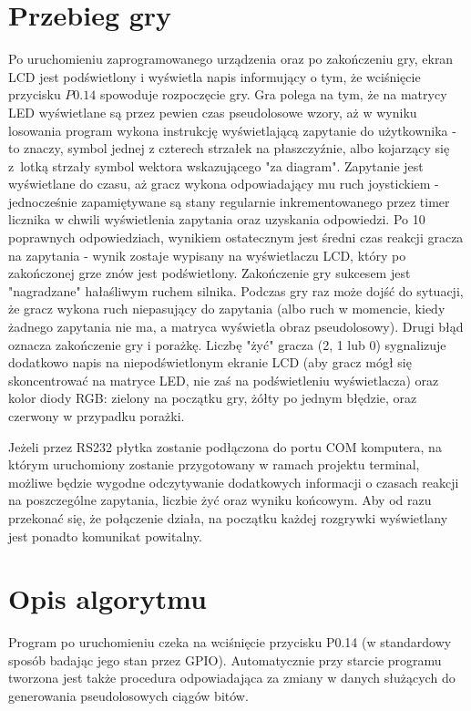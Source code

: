 \documentclass[a4paper, portrait,11pt]{article}
\begin{document}
\section{Przebieg gry}
Po uruchomieniu zaprogramowanego urządzenia oraz po zakończeniu gry, ekran
LCD jest podświetlony i wyświetla napis informujący o tym, że wciśnięcie
przycisku $P0.14$ spowoduje rozpoczęcie gry. Gra polega na tym, że
na matrycy LED wyświetlane są przez pewien czas pseudolosowe wzory,
aż w wyniku losowania program wykona instrukcję wyświetlającą
zapytanie do użytkownika - to znaczy, symbol jednej z czterech strzałek
na płaszczyźnie, albo kojarzący się z~lotką strzały symbol wektora
wskazującego "za diagram". Zapytanie jest wyświetlane do czasu, aż
gracz wykona odpowiadający mu ruch joystickiem - jednocześnie
zapamiętywane są stany regularnie inkrementowanego przez timer
licznika w chwili wyświetlenia zapytania oraz uzyskania odpowiedzi.
Po 10 poprawnych odpowiedziach, wynikiem ostatecznym jest średni
czas reakcji gracza na zapytania - wynik zostaje wypisany na wyświetlaczu LCD,
który po zakończonej grze znów jest podświetlony. Zakończenie gry sukcesem
jest "nagradzane" hałaśliwym ruchem silnika. Podczas gry raz może dojść
do sytuacji, że gracz wykona ruch niepasujący do zapytania (albo
ruch w momencie, kiedy żadnego zapytania nie ma, a matryca wyświetla
obraz pseudolosowy). Drugi błąd oznacza zakończenie gry i porażkę.
Liczbę "żyć" gracza (2, 1 lub 0) sygnalizuje dodatkowo napis
na niepodświetlonym ekranie LCD (aby gracz mógł się skoncentrować
na matryce LED, nie zaś na podświetleniu wyświetlacza) oraz kolor
diody RGB: zielony na początku gry, żółty po jednym błędzie,
oraz czerwony w przypadku porażki.

Jeżeli przez RS232 płytka zostanie podłączona do portu COM komputera,
na którym uruchomiony zostanie przygotowany w ramach projektu
terminal, możliwe będzie wygodne odczytywanie dodatkowych
informacji o czasach reakcji na poszczególne zapytania,
liczbie żyć oraz wyniku końcowym. Aby od razu przekonać się,
że połączenie działa, na początku każdej rozgrywki wyświetlany
jest ponadto komunikat powitalny.

\section{Opis algorytmu}
Program po uruchomieniu czeka na wciśnięcie przycisku P0.14 (w standardowy
sposób badając jego stan przez GPIO). Automatycznie przy starcie
programu tworzona jest także procedura odpowiadająca za zmiany
w danych służących do generowania pseudolosowych ciągów bitów.
\end{document}
